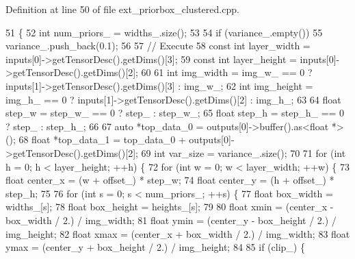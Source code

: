 Definition at line 50 of file ext\+\_\+priorbox\+\_\+clustered.\+cpp.


\begin{DoxyCode}
51                                                              \{
52         \textcolor{keywordtype}{int} num\_priors\_ = widths\_.size();
53 
54         \textcolor{keywordflow}{if} (variance\_.empty())
55             variance\_.push\_back(0.1);
56 
57         \textcolor{comment}{// Execute}
58         \textcolor{keyword}{const} \textcolor{keywordtype}{int} layer\_width = inputs[0]->getTensorDesc().getDims()[3];
59         \textcolor{keyword}{const} \textcolor{keywordtype}{int} layer\_height = inputs[0]->getTensorDesc().getDims()[2];
60 
61         \textcolor{keywordtype}{int} img\_width = img\_w\_ == 0 ? inputs[1]->getTensorDesc().getDims()[3] : img\_w\_;
62         \textcolor{keywordtype}{int} img\_height = img\_h\_ == 0 ? inputs[1]->getTensorDesc().getDims()[2] : img\_h\_;
63 
64         \textcolor{keywordtype}{float} step\_w = step\_w\_ == 0 ? step\_ : step\_w\_;
65         \textcolor{keywordtype}{float} step\_h = step\_h\_ == 0 ? step\_ : step\_h\_;
66 
67         \textcolor{keyword}{auto} *top\_data\_0 = outputs[0]->buffer().as<\textcolor{keywordtype}{float} *>();
68         \textcolor{keywordtype}{float} *top\_data\_1 = top\_data\_0 + outputs[0]->getTensorDesc().getDims()[2];
69         \textcolor{keywordtype}{int} var\_size = variance\_.size();
70 
71         \textcolor{keywordflow}{for} (\textcolor{keywordtype}{int} h = 0; h < layer\_height; ++h) \{
72             \textcolor{keywordflow}{for} (\textcolor{keywordtype}{int} w = 0; w < layer\_width; ++w) \{
73                 \textcolor{keywordtype}{float} center\_x = (w + offset\_) * step\_w;
74                 \textcolor{keywordtype}{float} center\_y = (h + offset\_) * step\_h;
75 
76                 \textcolor{keywordflow}{for} (\textcolor{keywordtype}{int} s = 0; s < num\_priors\_; ++s) \{
77                     \textcolor{keywordtype}{float} box\_width = widths\_[s];
78                     \textcolor{keywordtype}{float} box\_height = heights\_[s];
79 
80                     \textcolor{keywordtype}{float} xmin = (center\_x - box\_width / 2.) / img\_width;
81                     \textcolor{keywordtype}{float} ymin = (center\_y - box\_height / 2.) / img\_height;
82                     \textcolor{keywordtype}{float} xmax = (center\_x + box\_width / 2.) / img\_width;
83                     \textcolor{keywordtype}{float} ymax = (center\_y + box\_height / 2.) / img\_height;
84 
85                     \textcolor{keywordflow}{if} (clip\_) \{

\end{DoxyCode}
